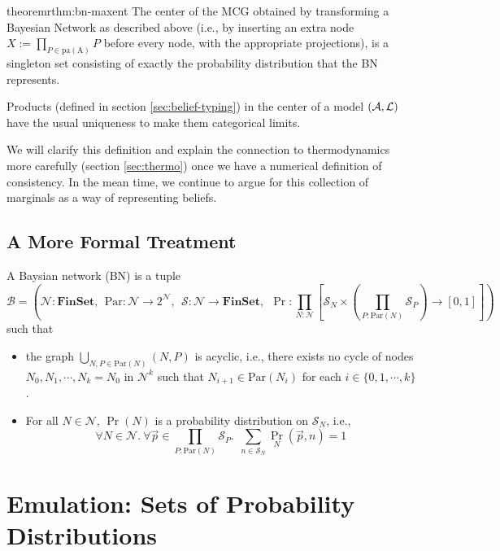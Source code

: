 \documentclass{article}
\begin{document}
	
	\begin{restatable}{theorem}{rthm:bn-maxent} \label{rthm:bn-maxent}
		The center of the MCG obtained by transforming a Bayesian Network as described above (i.e., by inserting an extra node $X := \prod_{P \in \mathrm{pa(A)}} P$ before every node, with the appropriate projections), is a singleton set consisting of exactly the probability distribution that the BN represents.
	\end{restatable}
	
	\begin{coro}
		Products (defined in section \ref{sec:belief-typing}) in the center of a model $(\cal A, L)$ have the usual uniqueness to make them categorical limits.
	\end{coro}
	
	We will clarify this definition and explain the connection to thermodynamics more carefully (section \ref{sec:thermo}) once we have a numerical definition of consistency. In the mean time, we continue to argue for this collection of marginals as a way of representing beliefs.
	
	\subsection{A More Formal Treatment}
	\begin{defn}
		A Baysian network (BN) is a tuple
		\[
		\mathcal B = \left(\mathcal N : \mathbf{FinSet}, ~~\mathrm{Par}: \mathcal N \to 2^{\mathcal N},~~ \mathcal S: \mathcal N \to \mathbf{FinSet},~~\Pr: \prod_{N : \mathcal N}  \left[ \mathcal S_N \times \left(\prod_{P : \mathrm{Par}(N)} \mathcal S_P\right)  \to [0,1] \right] \right)
		\]
		such that
		\begin{itemize}[nosep]
			\item the graph $\bigcup_{N, P \in \mathrm{Par}(N)}(N, P)$ is acyclic, i.e., there exists no cycle of nodes $N_0, N_1, \cdots, N_k = N_0$ in $\mathcal N^k$ such that $N_{i+1} \in \mathrm{Par}(N_i)$ for each $i \in \{0, 1, \cdots, k\}$.
			\item For all $N \in \mathcal N$, $\Pr(N)$ is a probability distribution on $\mathcal S_N$, i.e., 
			\[ \forall N\in \mathcal N.~\forall \vec{p} \in {\prod_{P : \mathrm{Par}(N)} \mathcal S_P}.~~ \sum_{n \in \mathcal S_{N}} \Pr_N(\vec{p}, n) = 1\]
		\end{itemize}
	\end{defn}


	\section{Emulation: Sets of Probability Distributions}
\end{document}

